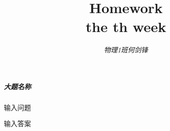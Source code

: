 \documentclass[UTF8]{ctexart}
\title{\textbf{Homework}\\ \large the th week}
\author{\slshape 物理1班\quad 何剑锋\quad 20172801}
\date{}
\begin{document}
\maketitle

\subparagraph{大题名称}

    \begin{Question}
        \item 输入问题

\begin{Answer}
    \begin{Solve}[Solve:]
        输入答案
    \end{Solve}
\end{Answer}

    \end{Question}
\end{document}
